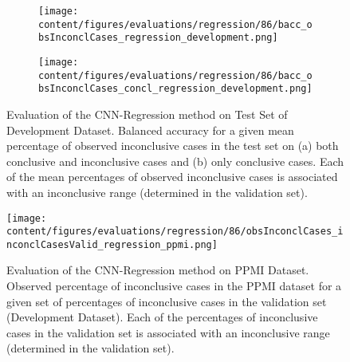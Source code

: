 \begin{figure}[t]
  \begin{subfigure}{0.9\textwidth}
    \centering
    \texttt{[image: content/figures/evaluations/regression/86/bacc\_obsInconclCases\_regression\_development.png]}
    \subcaption{}
    \label{fig:bacc_obsInconclCases_regression_development}
  \end{subfigure}
  \hfill
  \begin{subfigure}{0.9\textwidth}
    \centering
    \texttt{[image: content/figures/evaluations/regression/86/bacc\_obsInconclCases\_concl\_regression\_development.png]}
    \subcaption{}
    \label{fig:bacc_obsInconclCases_concl_regression_development}
  \end{subfigure}

  \caption{Evaluation of the CNN-Regression method on Test Set of Development Dataset.
  Balanced accuracy for a given mean percentage of observed inconclusive cases in the test set on 
  (a) both conclusive and inconclusive cases and (b) only conclusive cases. 
  Each of the mean percentages of observed inconclusive cases is associated with an inconclusive range (determined in the validation set). }
  \label{fig:bacc_obsInconclCases_regression_development_full}
\end{figure}




\begin{figure}[h]
\centering
\texttt{[image: content/figures/evaluations/regression/86/obsInconclCases\_inconclCasesValid\_regression\_ppmi.png]}
\caption{Evaluation of the CNN-Regression method on PPMI Dataset.
Observed percentage of inconclusive cases in the PPMI dataset 
for a given set of percentages of inconclusive cases in the validation set (Development Dataset).
Each of the percentages of inconclusive cases in the validation set is associated 
with an inconclusive range (determined in the validation set).} 
\label{fig:obsInconclCases_inconclCasesValid_regression_ppmi}
\end{figure} 


